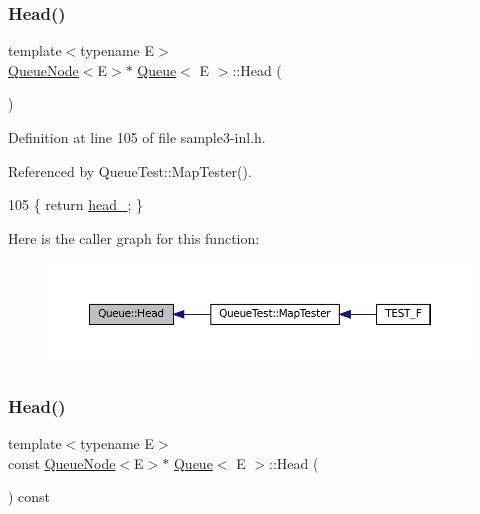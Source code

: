 \subsubsection{\texorpdfstring{Head()}{Head()}\hspace{0.1cm}{\footnotesize\ttfamily [1/2]}}
{\footnotesize\ttfamily template$<$typename E$>$ \\
\hyperlink{classQueueNode}{Queue\+Node}$<$E$>$$\ast$ \hyperlink{classQueue}{Queue}$<$ E $>$\+::Head (\begin{DoxyParamCaption}{ }\end{DoxyParamCaption})\hspace{0.3cm}{\ttfamily [inline]}}



Definition at line 105 of file sample3-\/inl.\+h.



Referenced by Queue\+Test\+::\+Map\+Tester().


\begin{DoxyCode}
105 \{ \textcolor{keywordflow}{return} \hyperlink{classQueue_abf9219bcea800d26e8bfdb4777d98729}{head\_}; \}
\end{DoxyCode}
Here is the caller graph for this function\+:
\nopagebreak
\begin{figure}[H]
\begin{center}
\leavevmode
\includegraphics[width=350pt]{classQueue_a71aa0154ef75bb87a53b6af1829fcd5e_icgraph}
\end{center}
\end{figure}
\mbox{\label{classQueue_a6c906075e0ad2d1f0634990aa106395e}} 
\subsubsection{\texorpdfstring{Head()}{Head()}\hspace{0.1cm}{\footnotesize\ttfamily [2/2]}}
{\footnotesize\ttfamily template$<$typename E$>$ \\
const \hyperlink{classQueueNode}{Queue\+Node}$<$E$>$$\ast$ \hyperlink{classQueue}{Queue}$<$ E $>$\+::Head (\begin{DoxyParamCaption}{ }\end{DoxyParamCaption}) const\hspace{0.3cm}{\ttfamily [inline]}}




